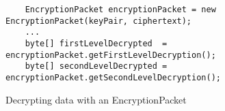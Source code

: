 \begin{figure}[H]
  \centering
  \begin{verbatim}
	EncryptionPacket encryptionPacket = new EncryptionPacket(keyPair, ciphertext);
	...
	byte[] firstLevelDecrypted  = encryptionPacket.getFirstLevelDecryption();
	byte[] secondLevelDecrypted = encryptionPacket.getSecondLevelDecryption();
  \end{verbatim}
  \caption{Decrypting data with an EncryptionPacket}
  \label{code:encryption_packet_decryption}
\end{figure}
